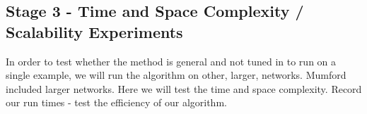 


\subsection{Stage 3 - Time and Space Complexity / Scalability Experiments}

In order to test whether the method is general and not tuned in to run on a single example, we will run the algorithm on other, larger, networks. Mumford included larger networks. Here we will test the time and space complexity.
Record our run times - test the efficiency of our algorithm.


